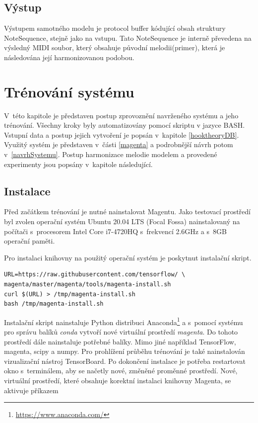 \section{Výstup}
Výstupem samotného modelu je protocol buffer 
kódující obsah struktury NoteSequence, 
stejně jako na vstupu.
Tato NoteSequence je interně převedena na výsledný MIDI soubor, 
který obsahuje původní melodii(primer), která je následována její harmonizovanou podobou.
\cite{google_git_polyphony}

\chapter{Trénování systému}
\label{trenovaniModelu}
V~této kapitole je představen postup zprovoznění navrženého systému a jeho trénování.
Všechny kroky byly automatizovány pomocí skriptu v jazyce BASH.
Vstupní data a postup jejich vytvoření je popsán v~kapitole \ref{hooktheoryDB}.
Využitý systém je představen v~části \ref{magenta} 
a podrobnější návrh potom v~\ref{navrhSystemu}.
Postup harmonizace melodie modelem a provedené experimenty jsou popsány v~kapitole následující.
\par

\section{Instalace}
Před začátkem trénování je nutné nainstalovat Magentu.
Jako testovací prostředí byl zvolen operační systém Ubuntu 20.04 LTS (Focal Fossa)
nainstalovaný na počítači s~procesorem Intel Core i7-4720HQ s~frekvencí 2.6GHz
a s~8GB operační paměti.

Pro instalaci knihovny na použitý operační systém je poskytnut instalační skript.

\begin{verbatim}
URL=https://raw.githubusercontent.com/tensorflow/ \
magenta/master/magenta/tools/magenta-install.sh
curl $(URL) > /tmp/magenta-install.sh
bash /tmp/magenta-install.sh    
\end{verbatim}
Instalační skript nainstaluje Python distribuci Anaconda\footnote{\url{https://www.anaconda.com/}}
a s~pomocí systému pro správu balíků \emph{conda} vytvoří nové virtuální prostředí \emph{magenta}.
Do tohoto prostředí dále nainstaluje potřebné balíky.
Mimo jiné například TensorFlow, magenta, scipy a numpy.
Pro prohlížení průběhu trénování je také nainstalován vizualizační nástroj TensorBoard.
Po dokončení instalace je potřeba restartovat okno s~terminálem,
aby se načetly nové, změněné proměnné prostředí.
Nové, virtuální prostředí, které obsahuje korektní instalaci knihovny Magenta,
se aktivuje příkazem

